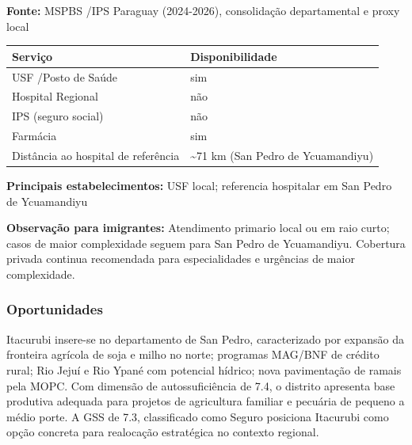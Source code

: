\textbf{Fonte:} MSPBS /\allowbreak  IPS Paraguay (2024-2026), consolidação
departamental e proxy local

{\def\LTcaptype{none} %
\begin{longtable}[]{@{}
  >{\raggedright\arraybackslash}p{}
  >{\raggedright\arraybackslash}p{}@{}}
\toprule\noalign{}
\begin{minipage}[b]{\linewidth}\raggedright
Serviço
\end{minipage} & \begin{minipage}[b]{\linewidth}\raggedright
Disponibilidade
\end{minipage} \\
\midrule\noalign{}
\endhead
\bottomrule\noalign{}
\endlastfoot
USF /\allowbreak  Posto de Saúde & sim \\
Hospital Regional & não \\
IPS (seguro social) & não \\
Farmácia & sim \\
Distância ao hospital de referência & \textasciitilde71 km (San Pedro de
Ycuamandiyu) \\
\end{longtable}
}

\textbf{Principais estabelecimentos:} USF local; referencia hospitalar
em San Pedro de Ycuamandiyu

\textbf{Observação para imigrantes:} Atendimento primario local ou em
raio curto; casos de maior complexidade seguem para San Pedro de
Ycuamandiyu. Cobertura privada continua recomendada para especialidades
e urgências de maior complexidade.
\newpage

\subsubsection*{Oportunidades}\label{oport-itacurubi-0207}
Itacurubi insere-se no departamento de San Pedro, caracterizado por expansão da fronteira agrícola de soja e milho no norte; programas MAG/BNF de crédito rural; Rio Jejuí e Rio Ypané com potencial hídrico; nova pavimentação de ramais pela MOPC. Com dimensão de autossuficiência de 7.4, o distrito apresenta base produtiva adequada para projetos de agricultura familiar e pecuária de pequeno a médio porte. A GSS de 7.3, classificado como Seguro posiciona Itacurubi como opção concreta para realocação estratégica no contexto regional.

